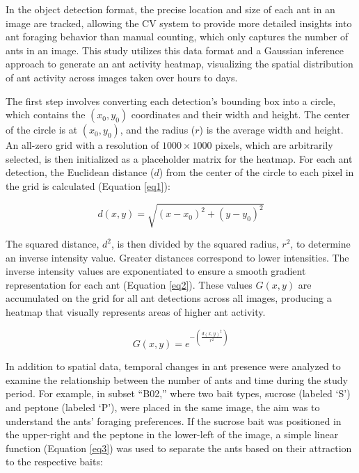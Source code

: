 In the object detection format, the precise location and size of each ant in an image are tracked, allowing the CV system to provide more detailed insights into ant foraging behavior than manual counting, which only captures the number of ants in an image. This study utilizes this data format and a Gaussian inference approach to generate an ant activity heatmap, visualizing the spatial distribution of ant activity across images taken over hours to days.

The first step involves converting each detection's bounding box into a circle, which contains the $(x_0, y_0)$ coordinates and their width and height. The center of the circle is at $(x_0, y_0)$, and the radius ($r$) is the average width and height. An all-zero grid with a resolution of $1000 \times 1000$ pixels, which are arbitrarily selected, is then initialized as a placeholder matrix for the heatmap. For each ant detection, the Euclidean distance ($d$) from the center of the circle to each pixel in the grid is calculated (Equation \ref{eq1}):

\begin{equation}
d(x, y) = \sqrt{(x - x_0)^2 + (y - y_0)^2}
\label{eq1}
\end{equation}

The squared distance, $d^2$, is then divided by the squared radius, $r^2$, to determine an inverse intensity value. Greater distances correspond to lower intensities. The inverse intensity values are exponentiated to ensure a smooth gradient representation for each ant (Equation \ref{eq2}). These values $G(x, y)$ are accumulated on the grid for all ant detections across all images, producing a heatmap that visually represents areas of higher ant activity.

\begin{equation}
G(x, y) = e^{- \left( \frac{d(x, y)^2}{r^2} \right)}
\label{eq2}
\end{equation}

In addition to spatial data, temporal changes in ant presence were analyzed to examine the relationship between the number of ants and time during the study period. For example, in subset “B02,” where two bait types, sucrose (labeled ‘S’) and peptone (labeled ‘P’), were placed in the same image, the aim was to understand the ants’ foraging preferences. If the sucrose bait was positioned in the upper-right and the peptone in the lower-left of the image, a simple linear function (Equation \ref{eq3}) was used to separate the ants based on their attraction to the respective baits:

